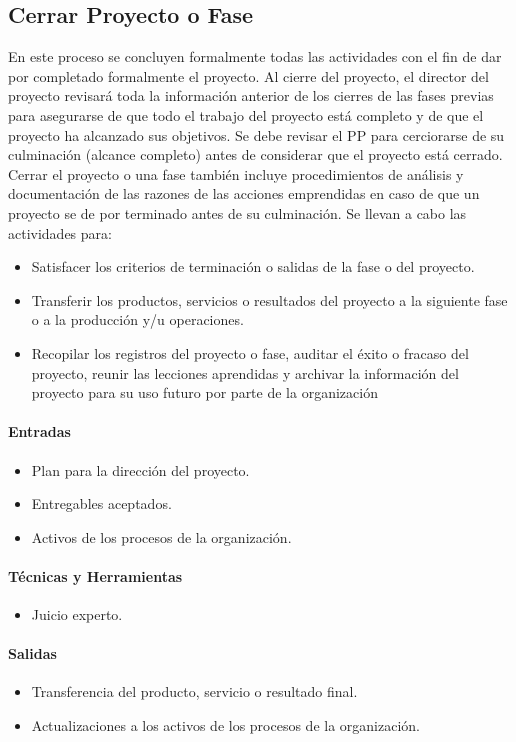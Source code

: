 \documentclass[a4paper,twosides]{article}
\newlength{\wideitemsep}
\let\olditem\item
\renewcommand{\item}{\setlength{\itemsep}{\wideitemsep}\olditem}
\begin{document}
\subsection{Cerrar Proyecto o Fase} \label{sec:cerrar_proyecto}
En este proceso se concluyen formalmente todas las actividades con el fin de dar por completado formalmente el proyecto.
Al cierre del proyecto, el director del proyecto revisará toda la información anterior de los cierres de las fases previas para asegurarse de que todo el trabajo del proyecto está completo y de que el proyecto ha alcanzado sus objetivos. Se debe revisar el PP para cerciorarse de su culminación (alcance completo) antes de considerar que el proyecto está cerrado.
Cerrar el proyecto o una fase también incluye procedimientos de análisis y documentación de las razones de las acciones emprendidas en caso de que un proyecto se de por terminado antes de su culminación.
Se llevan a cabo las actividades para:
\begin{itemize}
\item Satisfacer los criterios de terminación o salidas de la fase o del proyecto.
\item Transferir los productos, servicios o resultados del proyecto a la siguiente fase o a la producción y/u operaciones.
\item Recopilar los registros del proyecto o fase, auditar el éxito o fracaso del proyecto, reunir las lecciones aprendidas y archivar la información del proyecto para su uso futuro por parte de la organización
\end{itemize}
\paragraph{Entradas}
\begin{itemize}
\item Plan para la dirección del proyecto.
\item Entregables aceptados.
\item Activos de los procesos de la organización.
\end{itemize}
\paragraph{Técnicas y Herramientas}
\begin{itemize}
\item Juicio experto.
\end{itemize}
\paragraph{Salidas}
\begin{itemize}
\item Transferencia del producto, servicio o resultado final.
\item Actualizaciones a los activos de los procesos de la organización.
\end{itemize}
\end{document}

